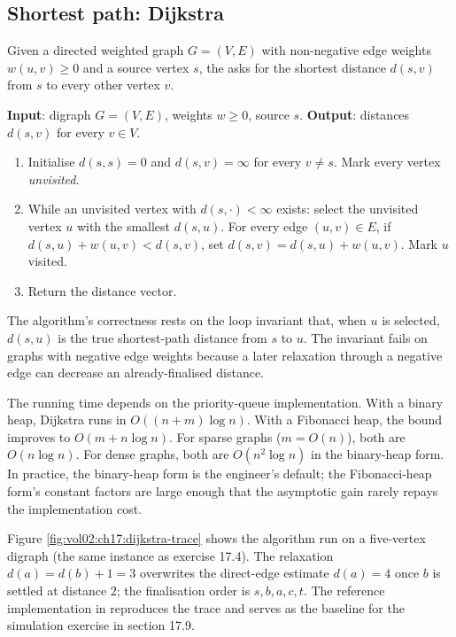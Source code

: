 \subsection{Shortest path: Dijkstra}

Given a directed weighted graph $G = (V, E)$ with non-negative edge
weights $w(u, v) \geq 0$ and a source vertex $s$, the
 asks for the shortest
distance $d(s, v)$ from $s$ to every other vertex $v$.

\begin{principle}
\textbf{Input}: digraph $G = (V, E)$, weights $w \geq 0$, source $s$.
\textbf{Output}: distances $d(s, v)$ for every $v \in V$.

\begin{enumerate}[leftmargin=*]
  \item Initialise $d(s, s) = 0$ and $d(s, v) = \infty$ for every
    $v \neq s$. Mark every vertex \emph{unvisited}.
  \item While an unvisited vertex with $d(s, \cdot) < \infty$
    exists: select the unvisited vertex $u$ with the smallest $d(s,
    u)$. For every edge $(u, v) \in E$, if $d(s, u) + w(u, v) <
    d(s, v)$, set $d(s, v) = d(s, u) + w(u, v)$. Mark $u$
    visited.
  \item Return the distance vector.
\end{enumerate}
\end{principle}

The algorithm's correctness rests on the loop invariant that, when
$u$ is selected, $d(s, u)$ is the true shortest-path distance from
$s$ to $u$. The invariant fails on graphs with negative edge weights
because a later relaxation through a negative edge can decrease an
already-finalised distance.

The running time depends on the priority-queue implementation. With
a binary heap, Dijkstra runs in $O((n + m) \log n)$. With a
Fibonacci heap, the bound improves to $O(m + n \log n)$. For sparse
graphs ($m = O(n)$), both are $O(n \log n)$. For dense graphs, both
are $O(n^{2} \log n)$ in the binary-heap form. In practice, the
binary-heap form is the engineer's default; the Fibonacci-heap
form's constant factors are large enough that the asymptotic gain
rarely repays the implementation cost.

Figure \ref{fig:vol02:ch17:dijkstra-trace} shows the algorithm run
on a five-vertex digraph (the same instance as exercise 17.4). The
relaxation $d(a) = d(b) + 1 = 3$ overwrites the direct-edge
estimate $d(a) = 4$ once $b$ is settled at distance $2$; the
finalisation order is $s, b, a, c, t$. The reference
implementation in
reproduces the trace and serves as the baseline for the simulation
exercise in section 17.9.


